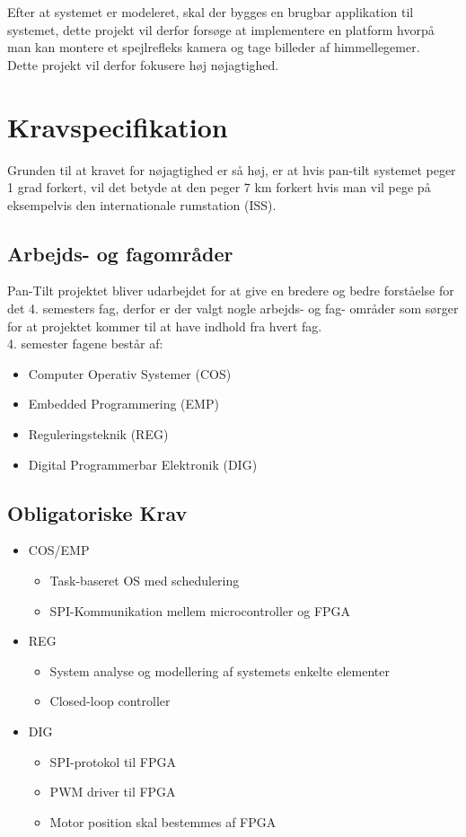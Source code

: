 Efter at systemet er modeleret, skal der bygges en brugbar applikation til systemet, dette projekt vil derfor forsøge at implementere en platform hvorpå man kan montere et spejlrefleks kamera og tage billeder af himmellegemer.\\
Dette projekt vil derfor fokusere høj nøjagtighed.\\

\section{Kravspecifikation}

Grunden til at kravet for nøjagtighed er så høj, er at hvis pan-tilt systemet peger 1 grad forkert, vil det betyde at den peger 7 km forkert hvis man vil pege på eksempelvis den internationale rumstation (ISS).

\subsection{Arbejds- og fagområder}
Pan-Tilt projektet bliver udarbejdet for at give en bredere og bedre forståelse for det 4. semesters fag, derfor er der valgt nogle arbejds- og fag- områder som sørger for at projektet kommer til at have indhold fra hvert fag.\\
4. semester fagene består af:
\begin{itemize}[noitemsep]
	\item Computer Operativ Systemer (COS)
	\item Embedded Programmering (EMP)
	\item Reguleringsteknik (REG)
	\item Digital Programmerbar Elektronik (DIG)
\end{itemize}

\subsection{Obligatoriske Krav}

\begin{itemize}[noitemsep]
	\item COS/EMP
	\begin{itemize}[noitemsep]
		\item Task-baseret OS med schedulering
		\item SPI-Kommunikation mellem microcontroller og FPGA
	\end{itemize}
	\item REG
	\begin{itemize}[noitemsep]
		\item System analyse og modellering af systemets enkelte elementer
		\item Closed-loop controller
	\end{itemize}
	\item DIG
	\begin{itemize}[noitemsep]
		\item SPI-protokol til FPGA
		\item PWM driver til FPGA
		\item Motor position skal bestemmes af FPGA
	\end{itemize}
\end{itemize}

